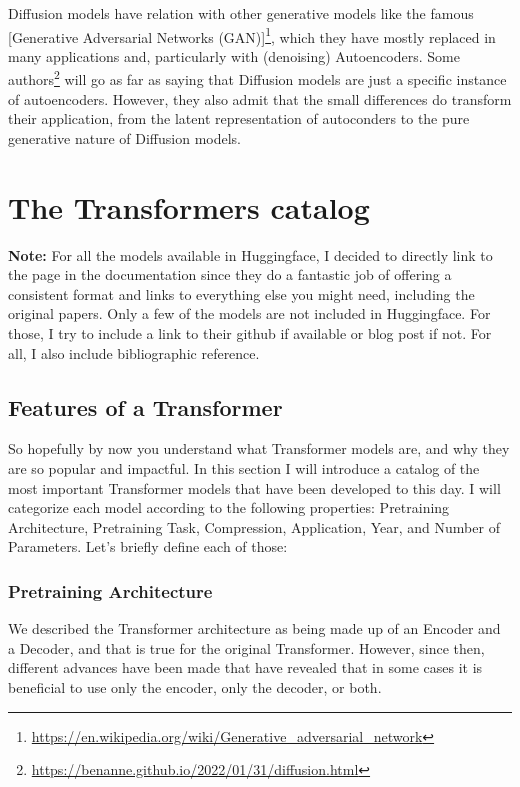 \documentclass{article}
\begin{document}
Diffusion models have relation with other generative models like the famous [Generative Adversarial Networks (GAN)]\footnote{\url{https://en.wikipedia.org/wiki/Generative_adversarial_network}}, which they have mostly replaced in many applications and, particularly with (denoising) Autoencoders. Some authors\footnote{\url{https://benanne.github.io/2022/01/31/diffusion.html}} will go as far as saying that Diffusion models are just a specific instance of autoencoders. However, they also admit that the small differences do transform their application, from the latent representation of autoconders to the pure generative nature of Diffusion models.

\section{The Transformers catalog}

\textbf{Note:} For all the models available in Huggingface, I decided to directly link to the page in the documentation since they do a fantastic job of offering a consistent format and links to everything else you might need, including the original papers. Only a few of the models are not included in Huggingface. For those, I try to include a link to their github if available or blog post if not. For all, I also include bibliographic reference.


\subsection{Features of a Transformer}

So hopefully by now you understand what Transformer models are, and why they are so popular and impactful. In this section I will introduce a catalog of the most important Transformer models that have been developed to this day. I will categorize each model according to the following properties: Pretraining Architecture, Pretraining Task, Compression, Application, Year, and Number of Parameters. Let’s briefly define each of those:

\subsubsection{Pretraining Architecture}

We described the Transformer architecture as being made up of an Encoder and a Decoder, and that is true for the original Transformer. However, since then, different advances have been made that have revealed that in some cases it is beneficial to use only the encoder, only the decoder, or both.
\end{document}
